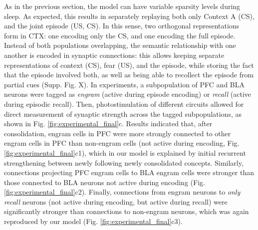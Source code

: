 \documentclass{article}
\begin{document}
\newline\newline
As in the previous section, the model can have variable sparsity levels during sleep. As expected, this results in separately replaying both only Context A (CS), and the joint episode (US, CS). In this sense, two orthogonal representations form in CTX: one encoding only the CS, and one encoding the full episode. Instead of both populations overlapping, the semantic relationship with one another is encoded in synaptic connections: this allows keeping separate representations of context (CS), fear (US), and the episode, while storing the fact that the episode involved both, as well as being able to recollect the episode from partial cues (Supp. Fig. X).
\newline\newline
In experiments, a subpopulation of PFC and BLA neurons were tagged as \textit{engram} (active during episode encoding) or \textit{recall} (active during episodic recall). Then, photostimulation of different circuits allowed for direct measurement of synaptic strength across the tagged subpopulations, as shown in Fig. \ref{fig:experimental_final}c. Results indicated that, after consolidation, engram cells in PFC were more strongly connected to other engram cells in PFC than non-engram cells (not active during encoding, Fig. \ref{fig:experimental_final}c1), which in our model is explained by initial recurrent strengthening between newly following newly consolidated concepts. Similarly, connections projecting PFC engram cells to BLA engram cells were stronger than those connected to BLA neurons not active during encoding (Fig. \ref{fig:experimental_final}c2). Finally, connections from engram neurons to \textit{only recall} neurons (not active during encoding, but active during recall) were significantly stronger than connections to non-engram neurons, which was again reproduced by our model (Fig. \ref{fig:experimental_final}c3).
\newline\newline
\end{document}
